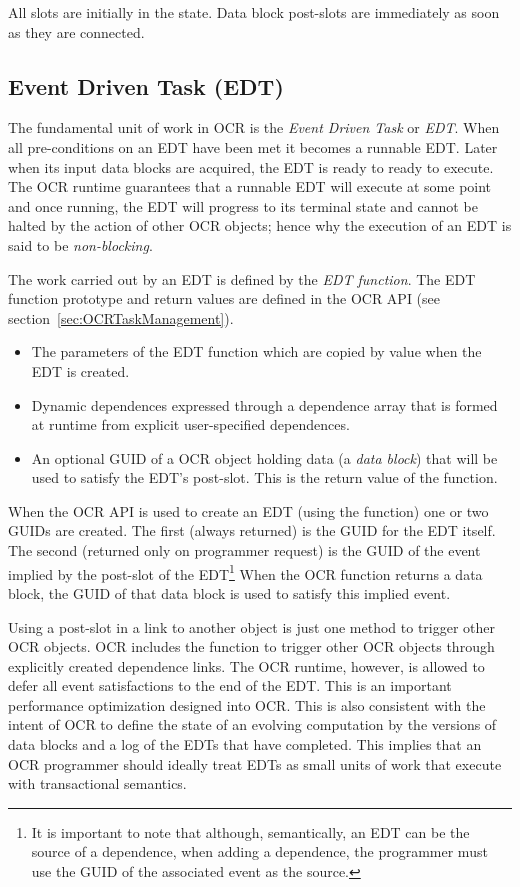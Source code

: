 All slots are initially in the  state. Data
block post-slots are immediately  as soon as they are
connected.

\subsection{Event Driven Task (EDT)}
\label{sec:EDT}

The fundamental unit of work in OCR is
the \emph{Event Driven Task} or \emph{EDT}.
When all pre-conditions on an EDT have been met it becomes a runnable EDT.
Later when its
input data blocks are acquired, the EDT is ready to ready to execute.  The OCR
runtime guarantees that a runnable EDT will execute at some point and once running,
the EDT will progress to its terminal state
and cannot be halted by the action of other OCR objects; hence why the
execution of an EDT is said to be \emph{non-blocking}.

The work carried out by an EDT is defined by
the \emph{EDT function}. The EDT function prototype
and return values are defined in the OCR API (see section~\ref{sec:OCRTaskManagement}).
\begin{itemize}
\item The parameters of the EDT function which are copied by value
when the EDT is created.
\item Dynamic dependences expressed through a dependence array that is
formed at runtime from explicit user-specified dependences.
\item An optional GUID of a OCR object holding data (a \emph{data
block}) that will be used to satisfy the EDT’s post-slot. This is the
return value of the function.
\end{itemize}

When the OCR API is used to create an EDT (using the  function)
one or two GUIDs are created.  The first (always returned) is the GUID for the EDT itself.
The second (returned only on programmer request) is the GUID of the
event implied by the post-slot of the EDT\footnote{It is important to
note that although, semantically, an EDT can be the source of a
dependence, when adding a dependence, the programmer must use the
GUID of the associated event as the source.}
When the OCR function returns a data block, the GUID of
that data block is used to satisfy this implied event.

Using a post-slot in a link to another object is just one method to
trigger other OCR objects. OCR includes the 
function to trigger other OCR objects through explicitly created dependence
links.  The OCR runtime, however, is allowed to defer all event satisfactions
to the end of the EDT.  This is an important performance optimization designed
into OCR.   This is also consistent with the intent of OCR to define the state
of an evolving computation by the versions of data blocks and a log of the
EDTs that have completed.   This implies that an OCR programmer should
ideally treat EDTs as small units of work that execute with transactional
semantics.

